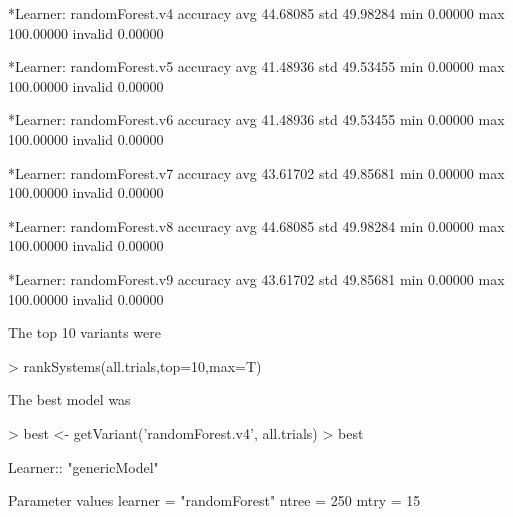 \documentclass{article}
\begin{document}
\begin{Schunk}
\begin{Soutput}
	*Learner: randomForest.v4 
         accuracy
avg      44.68085
std      49.98284
min       0.00000
max     100.00000
invalid   0.00000

	*Learner: randomForest.v5 
         accuracy
avg      41.48936
std      49.53455
min       0.00000
max     100.00000
invalid   0.00000

	*Learner: randomForest.v6 
         accuracy
avg      41.48936
std      49.53455
min       0.00000
max     100.00000
invalid   0.00000

	*Learner: randomForest.v7 
         accuracy
avg      43.61702
std      49.85681
min       0.00000
max     100.00000
invalid   0.00000

	*Learner: randomForest.v8 
         accuracy
avg      44.68085
std      49.98284
min       0.00000
max     100.00000
invalid   0.00000

	*Learner: randomForest.v9 
         accuracy
avg      43.61702
std      49.85681
min       0.00000
max     100.00000
invalid   0.00000
\end{Soutput}
\end{Schunk}

The top 10 variants were
\begin{Schunk}
\begin{Sinput}
> rankSystems(all.trials,top=10,max=T)
\end{Sinput}
\end{Schunk}

The best model was
\begin{Schunk}
\begin{Sinput}
> best <- getVariant('randomForest.v4', all.trials)
> best
\end{Sinput}
\begin{Soutput}
Learner::  "genericModel" 

Parameter values
	 learner  =  "randomForest" 
	 ntree  =  250 
	 mtry  =  15 
\end{Soutput}
\end{Schunk}
\end{document}
